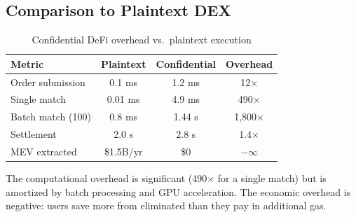 \subsection{Comparison to Plaintext DEX}

\begin{table}[h]
\centering
\begin{tabular}{lccc}
\toprule
\textbf{Metric} & \textbf{Plaintext \DEX{}} & \textbf{\Zoo{} Confidential} & \textbf{Overhead} \\
\midrule
Order submission & 0.1 ms & 1.2 ms & 12$\times$ \\
Single match & 0.01 ms & 4.9 ms & 490$\times$ \\
Batch match (100) & 0.8 ms & 1.44 s & 1,800$\times$ \\
Settlement & 2.0 s & 2.8 s & 1.4$\times$ \\
MEV extracted & \$1.5B/yr & \$0 & $-\infty$ \\
\bottomrule
\end{tabular}
\caption{Confidential DeFi overhead vs.\ plaintext execution}
\label{tab:overhead}
\end{table}

The computational overhead is significant (490$\times$ for a single match) but is amortized by batch processing and GPU acceleration. The economic overhead is negative: users save more from eliminated \MEV{} than they pay in additional gas.

